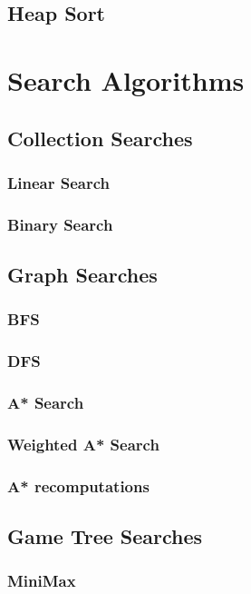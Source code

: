 \documentclass[12pt, letterpaper]{book}
\begin{document}
		\section{Heap Sort}

	\chapter{Search Algorithms}

	\section{Collection Searches}
		\subsection{Linear Search} \label{linear search}
		\subsection{Binary Search} \label{binary search}

	\section{Graph Searches}
		\subsection{BFS}
		\subsection{DFS}
		\subsection{A* Search}
		\subsection{Weighted A* Search}
		\subsection{A* recomputations}

	\section{Game Tree Searches} \label{game trees}
		\subsection{MiniMax} \label{minimax}
\end{document}
